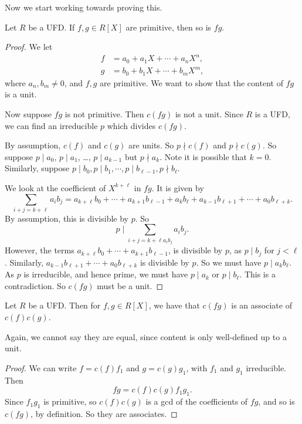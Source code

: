 \documentclass[a4paper]{article}
\begin{document}
Now we start working towards proving this.
\begin{lemma}
  Let $R$ be a UFD. If $f, g \in R[X]$ are primitive, then so is $fg$.
\end{lemma}

\begin{proof}
  We let
  \begin{align*}
    f &= a_0 + a_1X + \cdots + a_n X^n,\\
    g &= b_0 + b_1X + \cdots + b_m X^m,
  \end{align*}
  where $a_n, b_m \not= 0$, and $f, g$ are primitive. We want to show that the content of $fg$ is a unit.

  Now suppose $fg$ is not primitive. Then $c(fg)$ is not a unit. Since $R$ is a UFD, we can find an irreducible $p$ which divides $c(fg)$.

  By assumption, $c(f)$ and $c(g)$ are units. So $p\nmid c(f)$ and $p \nmid c(g)$. So suppose $p \mid a_0$, $p \mid a_1$, \ldots, $p \mid a_{k - 1}$ but $p \nmid a_k$. Note it is possible that $k = 0$. Similarly, suppose $p\mid b_0, p \mid b_1, \cdots, p\mid b_{\ell - 1}, p \nmid b_\ell$.

  We look at the coefficient of $X^{k + \ell}$ in $fg$. It is given by
  \[
    \sum_{i + j = k + \ell} a_i b_j = a_{k + \ell}b_0 + \cdots + a_{k + 1}b_{\ell - 1} + a_k b_{\ell} + a_{k - 1}b_{\ell + 1} + \cdots + a_0 b_{\ell + k}.
  \]
  By assumption, this is divisible by $p$. So
  \[
    p \mid \sum_{i + j = k + \ell a_i b_j} a_i b_j.
  \]
  However, the terms $a_{k + \ell}b_0 + \cdots + a_{k + 1} b_{\ell - 1}$, is divisible by $p$, as $p \mid b_j$ for $j < \ell$. Similarly, $a_{k - 1}b_{\ell + 1} + \cdots + a_0 b_{\ell + k}$ is divisible by $p$. So we must have $p \mid a_k b_\ell$. As $p$ is irreducible, and hence prime, we must have $p \mid a_k$ or $p \mid b_\ell$. This is a contradiction. So $c(fg)$ must be a unit.
\end{proof}

\begin{cor}
  Let $R$ be a UFD. Then for $f, g \in R[X]$, we have that $c(fg)$ is an associate of $c(f)c(g)$.
\end{cor}
Again, we cannot say they are equal, since content is only well-defined up to a unit.

\begin{proof}
  We can write $f = c(f) f_1$ and $g= c(g) g_1$, with $f_1$ and $g_1$ irreducible. Then
  \[
    fg = c(f)c(g) f_1g_1.
  \]
  Since $f_1g_1$ is primitive, so $c(f)c(g)$ is a gcd of the coefficients of $fg$, and so is $c(fg)$, by definition. So they are associates.
\end{proof}
\end{document}
